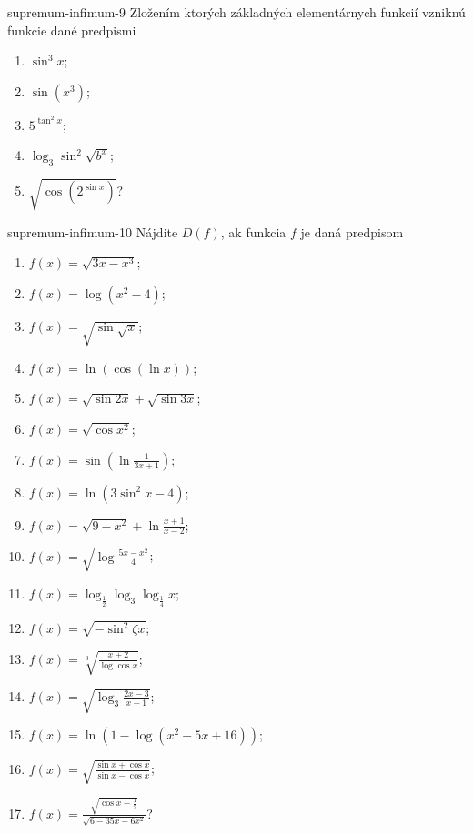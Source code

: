 \begin{defproblem}{supremum-infimum-9}
Zložením ktorých základných elementárnych funkcií vzniknú funkcie dané predpismi
\begin{multicols}{2}
\begin{enumerate}
    \item $\sin^3 x$;
    \item $\sin (x^3)$;
    \item $5^{\tan^2 x}$;
    \item $\log_3 \sin^2 \sqrt{b^x}$;
    \item $\sqrt{\cos (2^{\sin x})}$?
\end{enumerate}
\end{multicols}
\end{defproblem}

\begin{defproblem}{supremum-infimum-10}
Nájdite $D(f)$, ak funkcia $f$ je daná predpisom 
\begin{multicols}{2}
\begin{enumerate}
    \item $f(x)=\sqrt{3x-x^3}$;
    \item $f(x)=\log(x^2-4)$;
    \item $f(x)=\sqrt{\sin \sqrt{x}}$;
    \item $f(x)=\ln (\cos (\ln x))$;
    \item $f(x)=\sqrt{\sin 2x}+\sqrt{\sin 3x}$;
    \item $f(x)=\sqrt{\cos x^2}$;
    \item $f(x)=\sin (\ln \frac{1}{3x+1})$;
    \item $f(x)=\ln (3\sin^2 x -4)$;
    \item $f(x)=\sqrt{9-x^2}+\ln \frac{x+1}{x-2}$;
    \item $f(x)=\sqrt{\log \frac{5x-x^2}{4}}$;
    \item $f(x)=\log_\frac{1}{2}\log_3 \log_\frac{1}{4} x$;
    \item $f(x)=\sqrt{-\sin^2 \zeta x}$;
    \item $f(x)=\sqrt[3]{\frac{x+2}{\log\cos x}}$;
    \item $f(x)=\sqrt{\log_3 \frac{2x-3}{x-1}}$;
    \item $f(x)=\ln (1-\log (x^2-5x+16))$;
    \item $f(x)=\sqrt{\frac{\sin x +\cos x}{\sin x -\cos x}}$;
    \item $f(x)=\frac{\sqrt{\cos x -\frac{1}{2}}}{\sqrt{6-35x-6x^2}}$?
\end{enumerate}
\end{multicols}
\end{defproblem}

